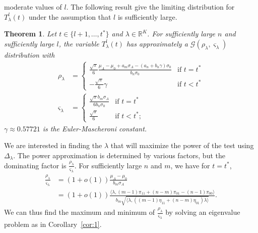 \documentclass[10pt,journal,compsoc]{IEEEtran}
\newtheorem{theorem}{Theorem}
\theoremstyle{definition}
\begin{document}
moderate values of $l$. The following result give the limiting
distribution for $T_{\lambda}^{l}(t)$ under the assumption that $l$ is
sufficiently large. 
\begin{theorem}
  \label{thm:8}
  Let $t \in \{l+1, \dots, t^{*}\}$ and $\lambda \in
  \mathbb{R}^{K}$. For sufficiently large $n$ and sufficiently large
  $l$, the variable $T_{\lambda}^{l}(t)$ has approximately a
  $\mathcal{G}(\rho_{\lambda}, \varsigma_{\lambda})$ distribution with
\begin{align}
  \label{eq:13}
  \rho_{\lambda} &= \begin{cases}
    \frac{\sqrt{\pi}}{6} \frac{\mu_A - \mu_0 + a_m\sigma_A - (a_n + b_n
      \gamma)\sigma_0}{b_n \sigma_0} & \text{if $t =
        t^{*}$} \\
      - \frac{ \sqrt{\pi}}{6} \gamma & \text{if $t < t^{*}$}
  \end{cases}\\
  \varsigma_{\lambda} &= \begin{cases}
    \frac{\sqrt{\pi} b_m \sigma_A}{6 b_n \sigma_0} & \text{if $t =
      t^{*}$} \\
    \frac{\sqrt{\pi}}{6} & \text{if $t < t^{*}$};
    \end{cases}
\end{align}
$\gamma \approx 0.57721$ is the Euler-Mascheroni constant.
\end{theorem}
We are interested in finding the $\lambda$ that will maximize the
power of the test using $\Delta_{\lambda}$. The power approximation is
determined by various factors, but the dominating factor is
$\tfrac{\rho_\lambda}{\varsigma_\lambda}$. For sufficiently large $n$
and $m$, we have for $t = t^{*}$,
\begin{equation*}
  \begin{split}
  \frac{\rho_\lambda}{\varsigma_\lambda} &= (1 + o(1)) \frac{\mu_A - \mu_0}{b_m
    \sigma_A} \\ &= (1 + o(1)) \frac{\langle \lambda, (m-1)\pi_{11} + (n-m)\pi_{01} -
    (n-1) \pi_{00} \rangle}{b_m \sqrt{\langle \lambda, ((m-1) \eta_{11} +
    (n-m)\eta_{01}) \lambda \rangle}}.
  \end{split}
\end{equation*}
We can thus find the maximum and minimum of
$\tfrac{\rho_{\lambda}}{\varsigma_{\lambda}}$ by solving an 
eigenvalue problem as in Corollary~\ref{cor:1}.
\end{document}
